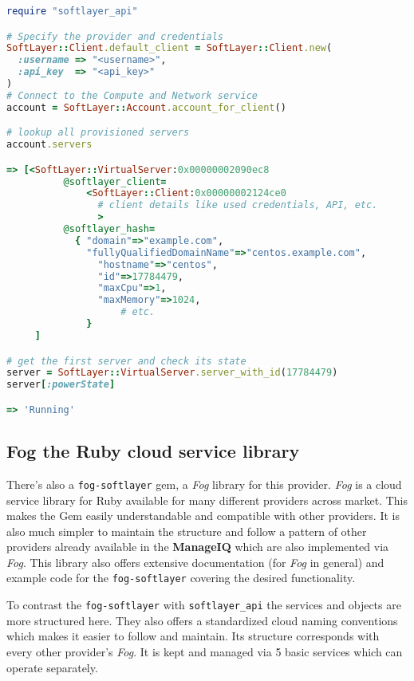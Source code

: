 \begin{lstlisting}[language=Ruby,caption={Example code for the \texttt{softlayer\_api}},label=code:softlayer_api,float=htpb]
require "softlayer_api"

# Specify the provider and credentials
SoftLayer::Client.default_client = SoftLayer::Client.new(
  :username => "<username>",
  :api_key  => "<api_key>"
)
# Connect to the Compute and Network service
account = SoftLayer::Account.account_for_client()

# lookup all provisioned servers
account.servers

=> [<SoftLayer::VirtualServer:0x00000002090ec8
		  @softlayer_client=
			  <SoftLayer::Client:0x00000002124ce0
				# client details like used credentials, API, etc.
				>
		  @softlayer_hash=
		   	{ "domain"=>"example.com",
		      "fullyQualifiedDomainName"=>"centos.example.com",
		    	"hostname"=>"centos",
		    	"id"=>17784479,
		    	"maxCpu"=>1,
		    	"maxMemory"=>1024,
					# etc.
			  }
	 ]

# get the first server and check its state
server = SoftLayer::VirtualServer.server_with_id(17784479)
server[:powerState]

=> 'Running'
\end{lstlisting}

\subsection{Fog the Ruby cloud service library}
\label{sub:Fog cloud library}

There's also a \texttt{fog-softlayer} gem, a \emph{Fog} library for this provider. \emph{Fog} is a cloud service library for Ruby available for many different providers across market. This makes the Gem easily understandable and compatible with other providers. It is also much simpler to maintain the structure and follow a pattern of other providers already available in the \textbf{ManageIQ} which are also implemented via \emph{Fog}. This library also offers extensive documentation (for \emph{Fog} in general) and example code for the \texttt{fog-softlayer} covering the desired functionality.

To contrast the \texttt{fog-softlayer} with \texttt{softlayer\_api} the services and objects are more structured here. They also offers a standardized cloud naming conventions which makes it easier to follow and maintain. Its structure corresponds with every other provider's \emph{Fog}. It is kept and managed via 5 basic services which can operate separately.


